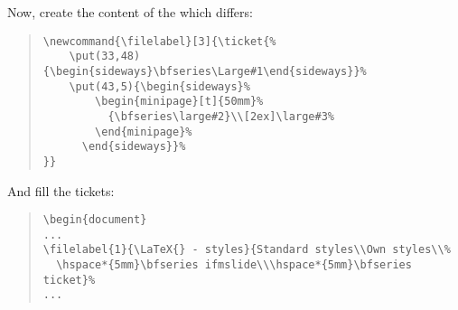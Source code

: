 \documentclass[a4paper,KOMA,landscape]{powersem}
\newcommand{\ticket}{{\code{ticket.sty}}}
\newcommand{\bs}{{\mtt\\}}
\begin{document}
\begin{slide}
\vspace*{10mm}
Now, create the content of the \code{\bs{}ticket} which differs:
\begin{quote}
    \begin{minipage}[t]{0.5\textwidth}
      {\scriptsize
\begin{verbatim}
\newcommand{\filelabel}[3]{\ticket{%
    \put(33,48){\begin{sideways}\bfseries\Large#1\end{sideways}}%
    \put(43,5){\begin{sideways}%
        \begin{minipage}[t]{50mm}%
          {\bfseries\large#2}\\[2ex]\large#3%
        \end{minipage}%
      \end{sideways}}%
}}
\end{verbatim}
        }
    \end{minipage}
\end{quote}

And fill the tickets:
\begin{quote}
    \begin{minipage}[t]{0.5\textwidth}
      {\scriptsize
\begin{verbatim}
\begin{document}
...
\filelabel{1}{\LaTeX{} - styles}{Standard styles\\Own styles\\%
  \hspace*{5mm}\bfseries ifmslide\\\hspace*{5mm}\bfseries ticket}%
...
\end{verbatim}
        }
    \end{minipage}
\end{quote}
\end{slide}
\end{document}
